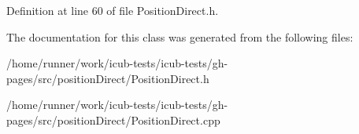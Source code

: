 Definition at line 60 of file Position\+Direct.\+h.



The documentation for this class was generated from the following files\+:\begin{DoxyCompactItemize}
\item 
/home/runner/work/icub-\/tests/icub-\/tests/gh-\/pages/src/position\+Direct/Position\+Direct.\+h\item 
/home/runner/work/icub-\/tests/icub-\/tests/gh-\/pages/src/position\+Direct/Position\+Direct.\+cpp\end{DoxyCompactItemize}
